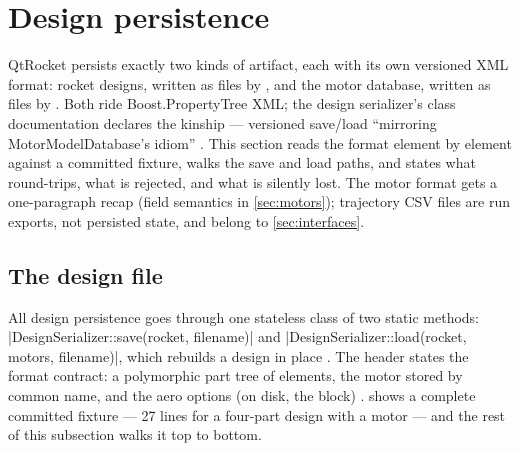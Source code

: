 \section{Design persistence}\label{sec:persistence}

QtRocket persists exactly two kinds of artifact, each with its own versioned XML format:
rocket designs, written as  files by 
, and the motor database, written as  files
by  . Both ride
Boost.PropertyTree XML; the design serializer's class documentation declares the kinship
--- versioned save/load ``mirroring MotorModelDatabase's idiom''
. This section reads the  format element by
element against a committed fixture, walks the save and load paths, and states what
round-trips, what is rejected, and what is silently lost. The motor format gets a
one-paragraph recap (field semantics in \cref{sec:motors}); trajectory CSV files are run
exports, not persisted state, and belong to \cref{sec:interfaces}.

\subsection{The  design file}\label{sec:persistence-qrd}

All design persistence goes through one stateless class of two static methods:
\cppinline|DesignSerializer::save(rocket, filename)| 
and \cppinline|DesignSerializer::load(rocket, motors, filename)|, which rebuilds a design
in place . The header states the format contract: a
polymorphic part tree of
elements, the motor stored by common name, and the aero options (on disk, the
 block) .  shows a complete committed
fixture --- 27 lines for a four-part design with a motor --- and the rest of this
subsection walks it top to bottom.

